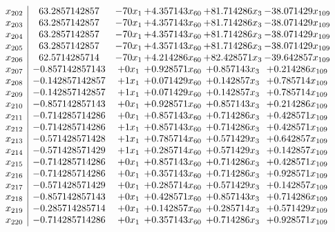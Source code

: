 \documentclass[11pt]{article}
\begin{document}
\[\begin{array}{c| c c@{\hskip 2pt} c@{\hskip 2pt} c@{\hskip 2pt} c@{\hskip 2pt} }
 x_{202}   &  63.2857142857 & -70 x_{1} & + 4.357143 x_{60} & + 81.714286 x_{3} & -38.071429 x_{109}\\
 x_{203}   &  63.2857142857 & -70 x_{1} & + 4.357143 x_{60} & + 81.714286 x_{3} & -38.071429 x_{109}\\
 x_{204}   &  63.2857142857 & -70 x_{1} & + 4.357143 x_{60} & + 81.714286 x_{3} & -38.071429 x_{109}\\
 x_{205}   &  63.2857142857 & -70 x_{1} & + 4.357143 x_{60} & + 81.714286 x_{3} & -38.071429 x_{109}\\
 x_{206}   &  62.5714285714 & -70 x_{1} & + 4.214286 x_{60} & + 82.428571 x_{3} & -39.642857 x_{109}\\
 x_{207}   &  -0.857142857143 & + 0 x_{1} & + 0.928571 x_{60} & + 0.857143 x_{3} & + 0.214286 x_{109}\\
 x_{208}   &  -0.142857142857 & + 1 x_{1} & + 0.071429 x_{60} & + 0.142857 x_{3} & + 0.785714 x_{109}\\
 x_{209}   &  -0.142857142857 & + 1 x_{1} & + 0.071429 x_{60} & + 0.142857 x_{3} & + 0.785714 x_{109}\\
 x_{210}   &  -0.857142857143 & + 0 x_{1} & + 0.928571 x_{60} & + 0.857143 x_{3} & + 0.214286 x_{109}\\
 x_{211}   &  -0.714285714286 & + 0 x_{1} & + 0.857143 x_{60} & + 0.714286 x_{3} & + 0.428571 x_{109}\\
 x_{212}   &  -0.714285714286 & + 1 x_{1} & + 0.857143 x_{60} & + 0.714286 x_{3} & + 0.428571 x_{109}\\
 x_{213}   &  -0.571428571428 & + 1 x_{1} & + 0.785714 x_{60} & + 0.571429 x_{3} & + 0.642857 x_{109}\\
 x_{214}   &  -0.571428571429 & + 1 x_{1} & + 0.285714 x_{60} & + 0.571429 x_{3} & + 0.142857 x_{109}\\
 x_{215}   &  -0.714285714286 & + 0 x_{1} & + 0.857143 x_{60} & + 0.714286 x_{3} & + 0.428571 x_{109}\\
 x_{216}   &  -0.714285714286 & + 0 x_{1} & + 0.357143 x_{60} & + 0.714286 x_{3} & + 0.928571 x_{109}\\
 x_{217}   &  -0.571428571429 & + 0 x_{1} & + 0.285714 x_{60} & + 0.571429 x_{3} & + 0.142857 x_{109}\\
 x_{218}   &  -0.857142857143 & + 0 x_{1} & + 0.428571 x_{60} & + 0.857143 x_{3} & + 0.714286 x_{109}\\
 x_{219}   &  -0.285714285714 & + 0 x_{1} & + 0.142857 x_{60} & + 0.285714 x_{3} & + 0.571429 x_{109}\\
 x_{220}   &  -0.714285714286 & + 0 x_{1} & + 0.357143 x_{60} & + 0.714286 x_{3} & + 0.928571 x_{109}\\

\end{array}\]
\end{document}
